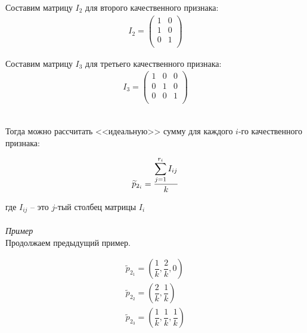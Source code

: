 \documentclass[14pt,fleqn]{extarticle}
\begin{document}
	Составим матрицу $I_2$ для второго качественного признака:
	\begin{align*}
		I_2 = 
		\begin{pmatrix}
			1 & 0\\
			1 & 0\\
			0 & 1\\
		\end{pmatrix}
	\end{align*}

	Составим матрицу $I_3$ для третьего качественного признака:
	\begin{align*}
		I_3 = 
		\begin{pmatrix}
			1 & 0 & 0\\
			0 & 1 & 0\\
			0 & 0 & 1\\
		\end{pmatrix}
	\end{align*}

	\noindent\makebox[\linewidth]{\rule{\paperwidth}{0.4pt}}\\
	
	Тогда можно рассчитать <<идеальную>> сумму для каждого $i$-го качественного признака:
	\begin{ceqn}
		\begin{align*}
			\widetilde{p}_{2_i} = \dfrac{\smashoperator[r]{\sum_{j=1}^{r_i}} I_{ij}}{k}
		\end{align*}
	\end{ceqn}
	
	где $I_{ij}$ -- это $j$-тый столбец матрицы $I_{i}$\\
	
	\noindent\makebox[\linewidth]{\rule{\paperwidth}{0.4pt}}\\
	
	\textit{Пример}\\
	
	Продолжаем предыдущий пример.
	\begin{ceqn}
		\begin{align*}
			\widetilde{p}_{2_1} = \left(\dfrac{1}{k}, \dfrac{2}{k}, 0\right)\\
			\widetilde{p}_{2_2} = \left(\dfrac{2}{k}, \dfrac{1}{k}\right)\\
			\widetilde{p}_{2_3} = \left(\dfrac{1}{k}, \dfrac{1}{k}, \dfrac{1}{k}\right)\\
		\end{align*}
	\end{ceqn}

	\vspace{-1cm}
	
\end{document}
